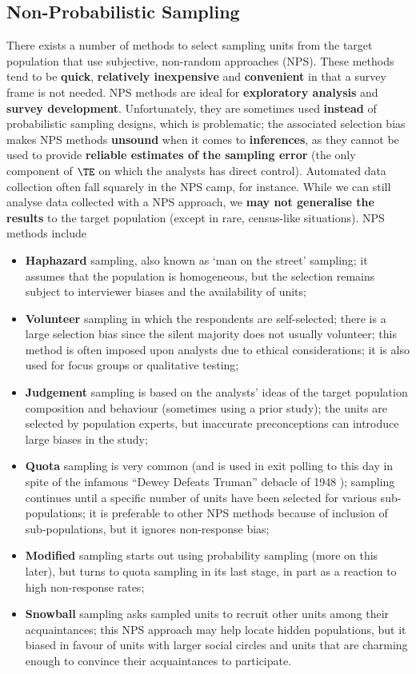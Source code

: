 \subsection{Non-Probabilistic Sampling}
There exists a number of methods to select sampling units from the target population that use subjective, non-random approaches (NPS). These methods tend to be \textbf{quick}, \textbf{relatively inexpensive} and \textbf{convenient} in that a survey frame is not needed. NPS methods are ideal for \textbf{exploratory analysis} and \textbf{survey development}. \newl Unfortunately, they are sometimes used \textbf{instead} of probabilistic sampling designs, which is problematic; the associated selection bias makes NPS methods \textbf{unsound} when it comes to \textbf{inferences}, as they cannot be used to provide \textbf{reliable estimates of the sampling error} (the only component of $\TE$ on which the analysts has direct control). Automated data collection often fall squarely in the NPS camp, for instance. While we can still analyse data collected with a NPS approach, we \textbf{may not generalise the results} to the target  population (except in rare, census-like situations). \newl
NPS methods include
\begin{itemize}[noitemsep]
\item \textbf{Haphazard} sampling, also known as `man on the street' sampling; it assumes that the population is homogeneous, but the selection remains subject to interviewer biases and the availability of units;
\item \textbf{Volunteer} sampling in which the  respondents are self-selected; there is a large selection bias since the silent majority does not usually volunteer; this method is often imposed upon analysts due to ethical considerations; it is also used for focus groups or qualitative testing;
\item \textbf{Judgement} sampling is based on the analysts' ideas of the target population composition
 and behaviour (sometimes using a prior study); the units are selected by population experts, but inaccurate preconceptions can introduce large biases in the study;
\item \textbf{Quota} sampling is very common (and is used in exit polling to this day in spite of the infamous ``Dewey Defeats Truman'' debacle of 1948 \cite{DC_DDT}); sampling continues until a
 specific number of units have been selected for various sub-populations; it is preferable to
 other NPS methods because of inclusion of sub-populations, but it ignores non-response bias;
\item \textbf{Modified} sampling starts out using probability sampling (more on this later), but turns to quota sampling in its last stage, in part as a reaction to high non-response rates;
\item \textbf{Snowball} sampling asks sampled units to recruit other units among their acquaintances; this NPS approach may help locate hidden populations, but it biased in favour of units with larger social circles and units that are charming enough to convince their acquaintances to participate. 
\end{itemize}
